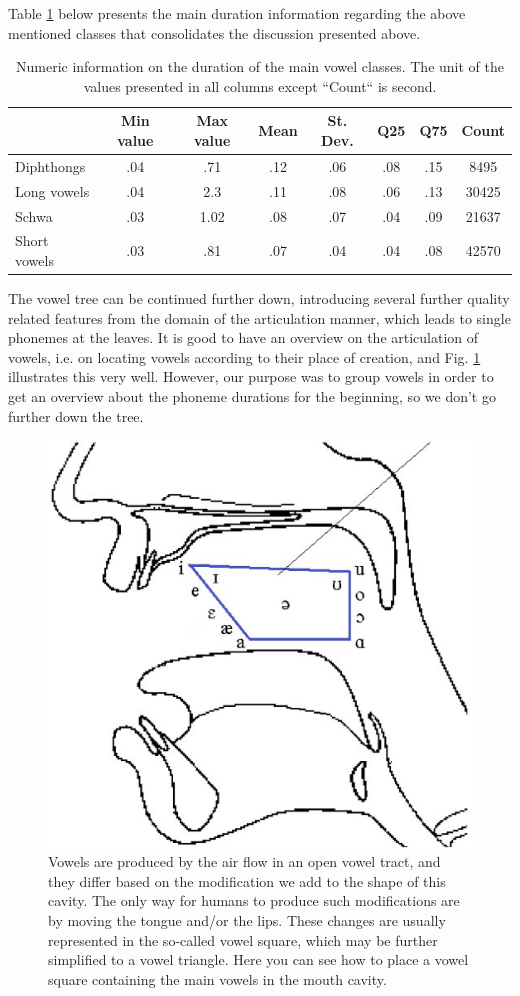 \documentclass[11pt,a4paper]{scrbook}
\begin{document}
Table \ref{tab:vowel_stats} below presents the main duration information regarding the above mentioned classes that consolidates the discussion presented above.
\begin{table}[htbp]
\centering
\begin{tabular}{|l|c|c|c|c|c|c|c|}

\hline
	 & Min value & Max value & Mean & St. Dev. & Q25 & Q75 & Count\\
\hline
\hline
Diphthongs  	& .04  & .71 & .12 & .06 & .08 & .15 & 8495\\
	\hline
Long vowels   & .04 & 2.3 &  .11 & .08 & .06 & .13 & 30425\\
	\hline
Schwa  &  .03 & 1.02 & .08 & .07 & .04 & .09 & 21637 \\
	\hline
Short vowels & .03 & .81 & .07 & .04 & .04 & .08 & 42570 \\
	\hline
\end{tabular}
\caption{Numeric information on the duration of the main vowel classes. The unit of the values presented in all columns except ``Count`` is second.} 
\label{tab:vowel_stats}
\end{table}

The vowel tree can be continued further down, introducing several further quality related features from the domain of the articulation manner, which leads to single phonemes at the leaves. It is good to have an overview on the articulation of vowels, i.e. on locating vowels according to their place of creation, and Fig. \ref{fig:vow_square} illustrates this very well. However, our purpose was to group vowels in order to get an overview about the phoneme durations for the beginning, so we don't go further down the tree. 

\begin{figure}[htbp]
	\includegraphics[width=.55\linewidth]{../Graphen/vow_art.eps}
	\centering
	\caption[Vowel square]{Vowels are produced by the air flow in an open vowel tract, and they differ based on the modification we add to the shape of this cavity. The only way for humans to produce such modifications are by moving the tongue and/or the lips. These changes are usually represented in the so-called vowel square, which may be further simplified to a vowel triangle. Here you can see how to place a vowel square containing the main vowels in the mouth cavity. }
	\label{fig:vow_square}
\end{figure}
\end{document}
